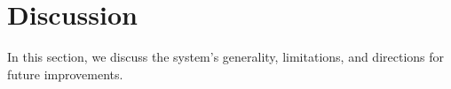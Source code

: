 \section{Discussion}

In this section, we discuss the system's generality, limitations, and directions for future improvements.







